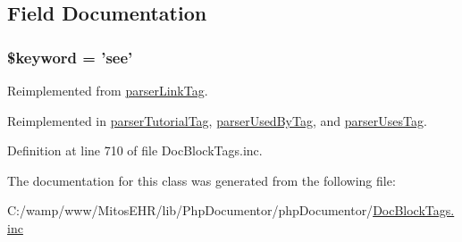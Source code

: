 \subsection{\-Field \-Documentation}
\hypertarget{classparser_see_tag_a4a925d6b38bcf3957c713a7d3dc7da1f}{
\subsubsection[{\$keyword}]{\setlength{\rightskip}{0pt plus 5cm}\$keyword = 'see'}}\label{classparser_see_tag_a4a925d6b38bcf3957c713a7d3dc7da1f}


\-Reimplemented from \hyperlink{classparser_link_tag_a4a925d6b38bcf3957c713a7d3dc7da1f}{parser\-Link\-Tag}.



\-Reimplemented in \hyperlink{classparser_tutorial_tag_a4a925d6b38bcf3957c713a7d3dc7da1f}{parser\-Tutorial\-Tag}, \hyperlink{classparser_used_by_tag_a4a925d6b38bcf3957c713a7d3dc7da1f}{parser\-Used\-By\-Tag}, and \hyperlink{classparser_uses_tag_a4a925d6b38bcf3957c713a7d3dc7da1f}{parser\-Uses\-Tag}.



\-Definition at line 710 of file \-Doc\-Block\-Tags.\-inc.



\-The documentation for this class was generated from the following file\-:\begin{DoxyCompactItemize}
\item 
\-C\-:/wamp/www/\-Mitos\-E\-H\-R/lib/\-Php\-Documentor/php\-Documentor/\hyperlink{_doc_block_tags_8inc}{\-Doc\-Block\-Tags.\-inc}\end{DoxyCompactItemize}
